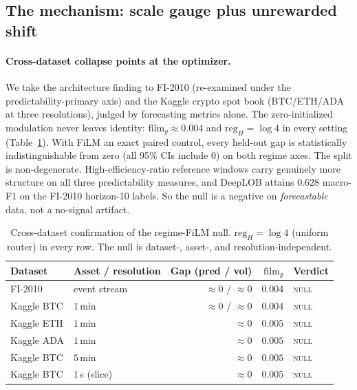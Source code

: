 \documentclass{article}
\begin{document}
\subsection{The mechanism: scale gauge plus unrewarded shift}\label{sec:gauge}

\paragraph{Cross-dataset collapse points at the optimizer.}
We take the architecture finding to FI-2010 (re-examined under the
predictability-primary axis) and the Kaggle crypto spot book (BTC/ETH/ADA at three
resolutions), judged by forecasting metrics alone. The zero-initialized modulation
never leaves identity: $\mathrm{film}_g\approx0.004$ and $\mathrm{reg}_H=\log 4$ in
every setting (Table~\ref{tab:film_null_xdata}). With FiLM an exact paired control,
every held-out gap is statistically indistinguishable from zero (all 95\% CIs
include 0) on both regime axes. The split is non-degenerate. High-efficiency-ratio
reference windows carry genuinely more structure on all three predictability
measures, and DeepLOB attains $0.628$ macro-F1 on the FI-2010 horizon-10 labels. So
the null is a negative on \emph{forecastable} data, not a no-signal artifact.

\begin{table}[t]
\centering
\small
\begin{tabular}{llrrl}
\toprule
Dataset & Asset / resolution & Gap (pred / vol) & $\mathrm{film}_g$ & Verdict \\
\midrule
FI-2010      & event stream          & $\approx 0$ / $\approx 0$ & $0.004$ & \textsc{null} \\
Kaggle BTC   & $1\,$min      & $\approx 0$ / $\approx 0$ & $0.004$ & \textsc{null} \\
Kaggle ETH   & $1\,$min      & $\approx 0$               & $0.005$ & \textsc{null} \\
Kaggle ADA   & $1\,$min      & $\approx 0$               & $0.005$ & \textsc{null} \\
Kaggle BTC   & $5\,$min      & $\approx 0$               & $0.005$ & \textsc{null} \\
Kaggle BTC   & $1\,$s (slice)& $\approx 0$               & $0.005$ & \textsc{null} \\
\bottomrule
\end{tabular}
\caption{Cross-dataset confirmation of the regime-FiLM null.
$\mathrm{reg}_H=\log 4$ (uniform router) in every row. The null is dataset-,
asset-, and resolution-independent.}
\label{tab:film_null_xdata}
\end{table}
\end{document}
